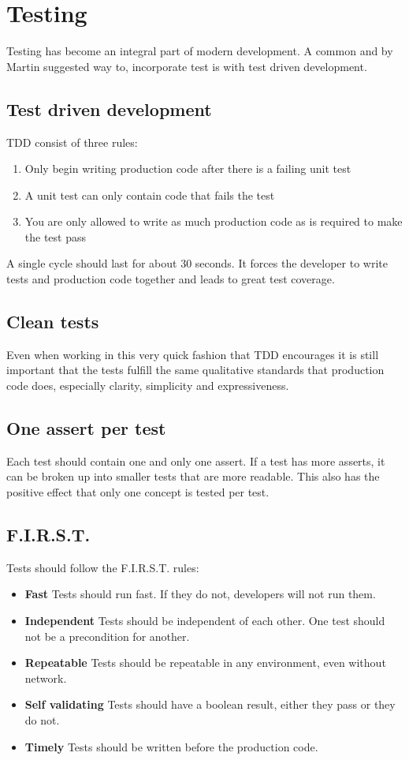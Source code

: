 \section{Testing}
Testing has become an integral part of modern development. A common and by Martin suggested way to, incorporate test is with test driven development.

\subsection{Test driven development}
TDD consist of three rules:

\begin{enumerate}
    \item Only begin writing production code after there is a failing unit test
    \item A unit test can only contain code that fails the test
    \item You are only allowed to write as much production code as is required to make the test pass
\end{enumerate}

A single cycle should last for about 30 seconds. It forces the developer to write tests and production code together and leads to great test coverage.

\subsection{Clean tests}
Even when working in this very quick fashion that TDD encourages it is still important that the tests fulfill the same qualitative standards that production code does, especially clarity, simplicity and expressiveness.

\subsection{One assert per test}
Each test should contain one and only one assert. If a test has more asserts, it can be broken up into smaller tests that are more readable. This also has the positive effect that only one concept is tested per test.

\subsection{F.I.R.S.T.}
Tests should follow the F.I.R.S.T. rules:

\begin{itemize}
    \item[] \textbf{Fast} Tests should run fast. If they do not, developers will not run them.
    \item[] \textbf{Independent} Tests should be independent of each other. One test should not be a precondition for another.
    \item[] \textbf{Repeatable} Tests should be repeatable in any environment, even without network.
    \item[] \textbf{Self validating} Tests should have a boolean result, either they pass or they do not.
    \item[] \textbf{Timely} Tests should be written before the production code.
\end{itemize}
